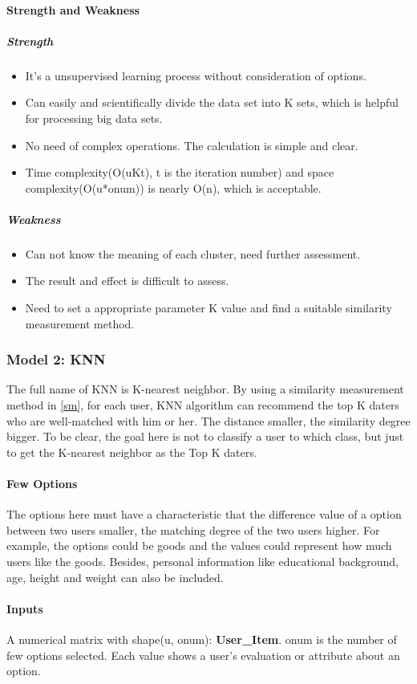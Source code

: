 \paragraph{Strength and Weakness}
\subparagraph{Strength}
\begin{itemize}
	\item It's a unsupervised learning process without consideration of options.
	\item Can easily and scientifically divide the data set into K sets, which is helpful for processing big data sets.
	\item No need of complex operations. The calculation is simple and clear.
	\item Time complexity(O(uKt), t is the iteration number) and space complexity(O(u*onum)) is nearly O(n), which is acceptable.
\end{itemize}
\subparagraph{Weakness}
\begin{itemize}
	\item Can not know the meaning of each cluster, need further assessment. 
	\item The result and effect is difficult to assess.
	\item Need to set a appropriate parameter K value and find a suitable similarity measurement method.
\end{itemize}

\subsubsection{Model 2: KNN}
The full name of KNN is K-nearest neighbor. By using a similarity measurement method in \ref{sm}, for each user, KNN algorithm can recommend the top K daters who are well-matched with him or her. The distance smaller, the similarity degree bigger. To be clear, the goal here is not to classify a user to which class, but just to get the K-nearest neighbor as the Top K daters.
\paragraph{Few Options} The options here must have a characteristic that the difference value of a option between two users smaller, the matching degree of the two users higher. For example, the options could be goods and the values could represent how much users like the goods. Besides, personal information like educational background, age, height and weight can also be included. 

\paragraph{Inputs}  A numerical matrix with shape(u, onum): \textbf{User\_Item}. onum is the number of few options selected. Each value shows a user's evaluation or attribute about an option.  

